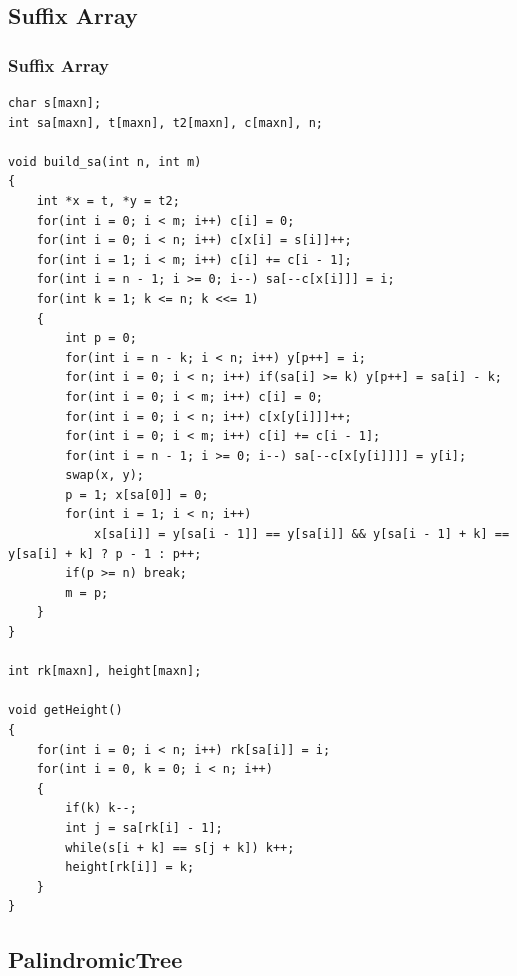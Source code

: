 \documentclass[twoside]{article}
\begin{document}
\subsection{Suffix Array}
\subsubsection{Suffix Array}
\begin{lstlisting}
char s[maxn];
int sa[maxn], t[maxn], t2[maxn], c[maxn], n;

void build_sa(int n, int m)
{
    int *x = t, *y = t2;
    for(int i = 0; i < m; i++) c[i] = 0;
    for(int i = 0; i < n; i++) c[x[i] = s[i]]++;
    for(int i = 1; i < m; i++) c[i] += c[i - 1];
    for(int i = n - 1; i >= 0; i--) sa[--c[x[i]]] = i;
    for(int k = 1; k <= n; k <<= 1)
    {
        int p = 0;
        for(int i = n - k; i < n; i++) y[p++] = i;
        for(int i = 0; i < n; i++) if(sa[i] >= k) y[p++] = sa[i] - k;
        for(int i = 0; i < m; i++) c[i] = 0;
        for(int i = 0; i < n; i++) c[x[y[i]]]++;
        for(int i = 0; i < m; i++) c[i] += c[i - 1];
        for(int i = n - 1; i >= 0; i--) sa[--c[x[y[i]]]] = y[i];
        swap(x, y);
        p = 1; x[sa[0]] = 0;
        for(int i = 1; i < n; i++)
            x[sa[i]] = y[sa[i - 1]] == y[sa[i]] && y[sa[i - 1] + k] == y[sa[i] + k] ? p - 1 : p++;
        if(p >= n) break;
        m = p;
    }
}

int rk[maxn], height[maxn];

void getHeight()
{
    for(int i = 0; i < n; i++) rk[sa[i]] = i;
    for(int i = 0, k = 0; i < n; i++)
    {
        if(k) k--;
        int j = sa[rk[i] - 1];
        while(s[i + k] == s[j + k]) k++;
        height[rk[i]] = k;
    }
}
\end{lstlisting}
\subsection{PalindromicTree}
\end{document}
